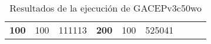 \begin{table}[H]
\begin{tabular}{|ccrccrccc}
\multicolumn{1}{|c|}{\multirow{-39}{*}{\cellcolor[HTML]{FFFFC7}\textbf{100}}} & \multicolumn{1}{c|}{\multirow{-9}{*}{\cellcolor[HTML]{DDFDFF}100}} & \multicolumn{1}{r|}{\cellcolor[HTML]{DAE8FC}111113}    & \multicolumn{1}{c|}{\multirow{-39}{*}{\cellcolor[HTML]{FFFFC7}\textbf{200}}} & \multicolumn{1}{c|}{\multirow{-10}{*}{\cellcolor[HTML]{DDFDFF}100}} & \multicolumn{1}{r|}{\cellcolor[HTML]{DDFDFF}525041}    &                                                                              &                                                                    &                                                        \\ \cline{1-6}
\end{tabular}
\caption{\label{GACEPv3c50woGRASP}Resultados de la ejecución de GACEPv3c50wo}
\end{table}

